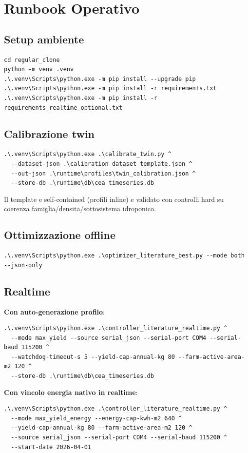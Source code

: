 ﻿\documentclass[11pt,a4paper]{report}
\begin{document}
\newpage
\chapter{Runbook Operativo}

\section{Setup ambiente}
\begin{lstlisting}
cd regular_clone
python -m venv .venv
.\.venv\Scripts\python.exe -m pip install --upgrade pip
.\.venv\Scripts\python.exe -m pip install -r requirements.txt
.\.venv\Scripts\python.exe -m pip install -r requirements_realtime_optional.txt
\end{lstlisting}

\section{Calibrazione twin}
\begin{lstlisting}
.\.venv\Scripts\python.exe .\calibrate_twin.py ^
  --dataset-json .\calibration_dataset_template.json ^
  --out-json .\runtime\profiles\twin_calibration.json ^
  --store-db .\runtime\db\cea_timeseries.db
\end{lstlisting}
Il template e self-contained (profili inline) e validato con controlli hard su coerenza famiglia/densita/sottosistema idroponico.

\section{Ottimizzazione offline}
\begin{lstlisting}
.\.venv\Scripts\python.exe .\optimizer_literature_best.py --mode both --json-only
\end{lstlisting}

\section{Realtime}
\textbf{Con auto-generazione profilo}:
\begin{lstlisting}
.\.venv\Scripts\python.exe .\controller_literature_realtime.py ^
  --mode max_yield --source serial_json --serial-port COM4 --serial-baud 115200 ^
  --watchdog-timeout-s 5 --yield-cap-annual-kg 80 --farm-active-area-m2 120 ^
  --store-db .\runtime\db\cea_timeseries.db
\end{lstlisting}

\textbf{Con vincolo energia nativo in realtime}:
\begin{lstlisting}
.\.venv\Scripts\python.exe .\controller_literature_realtime.py ^
  --mode max_yield_energy --energy-cap-kwh-m2 640 ^
  --yield-cap-annual-kg 80 --farm-active-area-m2 120 ^
  --source serial_json --serial-port COM4 --serial-baud 115200 ^
  --start-date 2026-04-01
\end{lstlisting}
\end{document}
